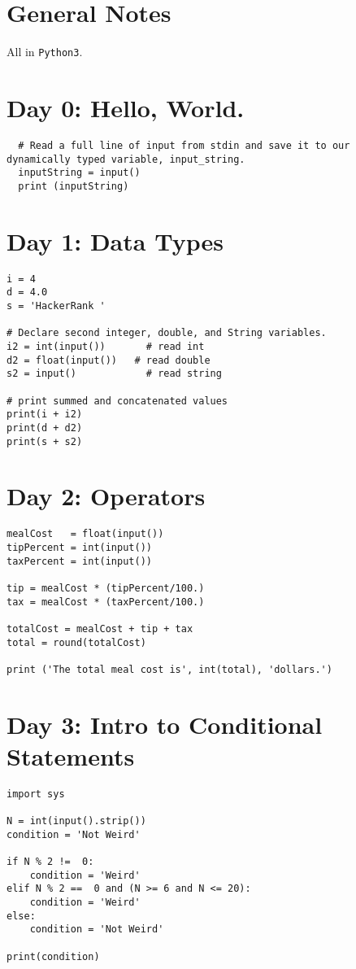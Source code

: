 \documentclass[11pt,a4paper]{article}
\begin{document}
\tableofcontents


\section*{General Notes}
All in {\tt Python3}. 

\newpage
\section{Day 0: Hello, World.}
\begin{lstlisting}
  # Read a full line of input from stdin and save it to our dynamically typed variable, input_string.
  inputString = input()
  print (inputString)
\end{lstlisting}

\newpage
\section{Day 1: Data Types}
\begin{lstlisting}
i = 4
d = 4.0
s = 'HackerRank '

# Declare second integer, double, and String variables.
i2 = int(input())       # read int
d2 = float(input())   # read double 
s2 = input()            # read string

# print summed and concatenated values
print(i + i2)
print(d + d2)
print(s + s2)
\end{lstlisting}

\newpage
\section{Day 2: Operators}
\begin{lstlisting}
mealCost   = float(input()) 
tipPercent = int(input())   
taxPercent = int(input()) 

tip = mealCost * (tipPercent/100.)
tax = mealCost * (taxPercent/100.)

totalCost = mealCost + tip + tax
total = round(totalCost)

print ('The total meal cost is', int(total), 'dollars.')
\end{lstlisting}


\newpage
\section{Day 3: Intro to Conditional Statements}
\begin{lstlisting}
import sys

N = int(input().strip())
condition = 'Not Weird' 

if N % 2 !=  0:
    condition = 'Weird'
elif N % 2 ==  0 and (N >= 6 and N <= 20):
    condition = 'Weird'
else:
    condition = 'Not Weird' 

print(condition)        

\end{lstlisting}
\end{document}
